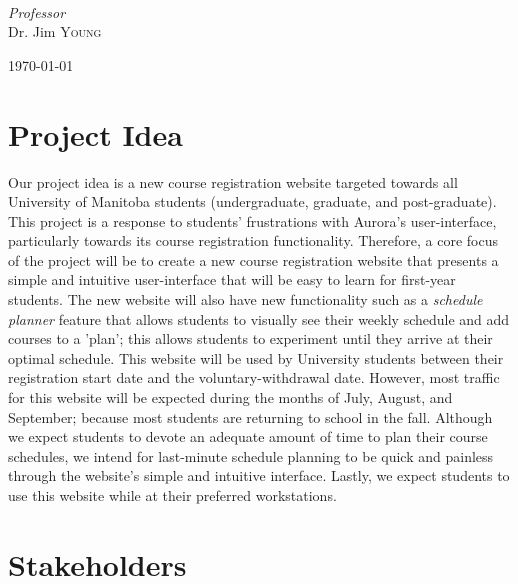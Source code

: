 \documentclass{article}
\begin{document}
\begin{titlepage}
\begin{minipage}{0.4\textwidth}
\begin{flushleft}
		\end{flushleft}
	\end{minipage}
	~
	\begin{minipage}{0.4\textwidth}
		\begin{flushright}
			\large
			\textit{Professor}\\
			Dr. Jim \textsc{Young} %
		\end{flushright}
	\end{minipage}

	
	\vfill\vfill\vfill %
	
	{\large\today} %

	\vfill %
	
\end{titlepage}
\newpage

\section{Project Idea}
Our project idea is a new course registration website targeted towards all University of Manitoba students (undergraduate, graduate, and post-graduate). This project is a response to students' frustrations with Aurora's user-interface, particularly towards its course registration functionality. Therefore, a core focus of the project will be to create a new course registration website that presents a simple and intuitive user-interface that will be easy to learn for first-year students. The new website will also have new functionality such as a \textit{schedule planner} feature that allows students to visually see their weekly schedule and add courses to a 'plan'; this allows students to experiment until they arrive at their optimal schedule. This website will be used by University students between their registration start date and the voluntary-withdrawal date. However, most traffic for this website will be expected during the months of July, August, and September; because most students are returning to school in the fall. Although we expect students to devote an adequate amount of time to plan their course schedules, we intend for last-minute schedule planning to be quick and painless through the website's simple and intuitive interface. Lastly, we expect students to use this website while at their preferred workstations. 


\section{Stakeholders}
\end{document}
